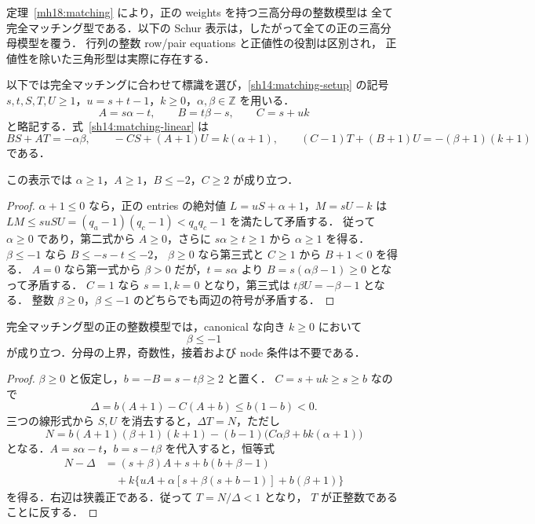 

定理~\ref{mh18:matching} により，正の weights を持つ三高分母の整数模型は
全て完全マッチング型である．以下の Schur 表示は，したがって全ての正の三高分母模型を覆う．
行列の整数 row/pair equations と正値性の役割は区別され，
正値性を除いた三角形型は実際に存在する．

以下では完全マッチングに合わせて標識を選び，\ref{sh14:matching-setup} の記号
$s,t,S,T,U\geq1$，$u=s+t-1$，$k\geq0$，$\alpha,\beta\in\mathbb Z$ を用いる．
\[
 A=s\alpha-t,\qquad B=t\beta-s,\qquad C=s+uk
\]
と略記する．式~\eqref{sh14:matching-linear} は
\begin{equation}\label{sm14:linear}
 BS+AT=-\alpha\beta,\qquad
 -CS+(A+1)U=k(\alpha+1),\qquad
 (C-1)T+(B+1)U=-(\beta+1)(k+1)
\end{equation}
である．

\begin{lemma}
\label{sm14:basic-bounds}
この表示では $\alpha\geq1$，$A\geq1$，$B\leq-2$，$C\geq2$ が成り立つ．
\end{lemma}

\begin{proof}
$\alpha+1\leq0$ なら，正の entries の絶対値 $L=uS+\alpha+1$，$M=sU-k$ は
$LM\leq suSU=(q_a-1)(q_c-1)<q_aq_c-1$ を満たして矛盾する．
従って $\alpha\geq0$ であり，第二式から $A\geq0$，さらに $s\alpha\geq t\geq1$ から
$\alpha\geq1$ を得る．$\beta\leq-1$ なら $B\leq-s-t\leq-2$，
$\beta\geq0$ なら第三式と $C\geq1$ から $B+1<0$ を得る．
$A=0$ なら第一式から $\beta>0$ だが，$t=s\alpha$ より
$B=s(\alpha\beta-1)\geq0$ となって矛盾する．
$C=1$ なら $s=1,k=0$ となり，第三式は $t\beta U=-\beta-1$ となる．
整数 $\beta\geq0$，$\beta\leq-1$ のどちらでも両辺の符号が矛盾する．
\end{proof}

\begin{theorem}
\label{sm14:beta-negative}
完全マッチング型の正の整数模型では，canonical な向き $k\geq0$ において
\[
 \beta\leq-1
\]
が成り立つ．分母の上界，奇数性，接着および node 条件は不要である．
\end{theorem}

\begin{proof}
$\beta\geq0$ と仮定し，$b=-B=s-t\beta\geq2$ と置く．
$C=s+uk\geq s\geq b$ なので
\[
 \Delta=b(A+1)-C(A+b)\leq b(1-b)<0.
\]
三つの線形式から $S,U$ を消去すると，$\Delta T=N$，ただし
\[
 N=b(A+1)(\beta+1)(k+1)
   -(b-1)\bigl(C\alpha\beta+bk(\alpha+1)\bigr)
\]
となる．$A=s\alpha-t$，$b=s-t\beta$ を代入すると，恒等式
\begin{align*}
 N-\Delta
  &=(s+\beta)A+s+b(b+\beta-1)\\
  &\quad+k\bigl\{uA+\alpha[s+\beta(s+b-1)]+b(\beta+1)\bigr\}
\end{align*}
を得る．右辺は狭義正である．従って $T=N/\Delta<1$ となり，
$T$ が正整数であることに反する．
\end{proof}

